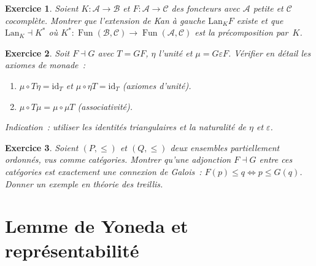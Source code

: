 \documentclass[a4paper,12pt]{book}
\DeclareMathOperator{\Fun}{Fun}
\newcommand{\id}{\mathrm{id}}
\newtheorem{exercice}{Exercice}[chapter]
\begin{document}
\begin{exercice}\label{exo:adj-kan}
Soient $K\colon\mathcal{A}\to\mathcal{B}$ et $F\colon\mathcal{A}\to\mathcal{C}$
des foncteurs avec $\mathcal{A}$ petite et $\mathcal{C}$ cocomplète.
Montrer que l'extension de Kan à gauche $\mathrm{Lan}_K F$
existe et que $\mathrm{Lan}_K\dashv K^*$ où
$K^*\colon\Fun(\mathcal{B},\mathcal{C})\to\Fun(\mathcal{A},\mathcal{C})$
est la précomposition par~$K$.
\end{exercice}

\begin{exercice}\label{exo:adj-monade}
Soit $F\dashv G$ avec $T=GF$, $\eta$ l'unité et $\mu=G\varepsilon F$.
Vérifier en détail les axiomes de monade~:
\begin{enumerate}[label=(\alph*)]
\item $\mu\circ T\eta = \id_T$ et $\mu\circ\eta T = \id_T$
      (axiomes d'unité).
\item $\mu\circ T\mu = \mu\circ\mu T$ (associativité).
\end{enumerate}
\emph{Indication}~: utiliser les identités triangulaires et la
naturalité de $\eta$ et $\varepsilon$.
\end{exercice}

\begin{exercice}\label{exo:adj-galois}
Soient $(P,\leq)$ et $(Q,\leq)$ deux ensembles partiellement ordonnés,
vus comme catégories. Montrer qu'une adjonction $F\dashv G$
entre ces catégories est exactement une \emph{connexion de Galois}~:
$F(p)\leq q \Leftrightarrow p\leq G(q)$.
Donner un exemple en théorie des treillis.
\end{exercice}



\chapter{Lemme de Yoneda et représentabilité}\label{ch:yoneda}
\minitoc
\end{document}
